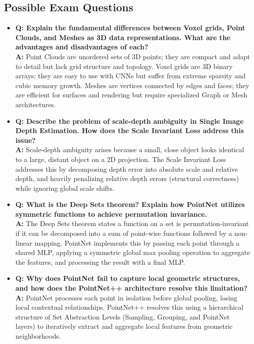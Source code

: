 \subsection{Possible Exam Questions}
\begin{itemize}
    \item \textbf{Q: Explain the fundamental differences between Voxel grids, Point Clouds, and Meshes as 3D data representations. What are the advantages and disadvantages of each?} \\
    \textbf{A:} Point Clouds are unordered sets of 3D points; they are compact and adapt to detail but lack grid structure and topology. Voxel grids are 3D binary arrays; they are easy to use with CNNs but suffer from extreme sparsity and cubic memory growth. Meshes are vertices connected by edges and faces; they are efficient for surfaces and rendering but require specialized Graph or Mesh architectures.
    \item \textbf{Q: Describe the problem of scale-depth ambiguity in Single Image Depth Estimation. How does the Scale Invariant Loss address this issue?} \\
    \textbf{A:} Scale-depth ambiguity arises because a small, close object looks identical to a large, distant object on a 2D projection. The Scale Invariant Loss addresses this by decomposing depth error into absolute scale and relative depth, and heavily penalizing relative depth errors (structural correctness) while ignoring global scale shifts.
    \item \textbf{Q: What is the Deep Sets theorem? Explain how PointNet utilizes symmetric functions to achieve permutation invariance.} \\
    \textbf{A:} The Deep Sets theorem states a function on a set is permutation-invariant if it can be decomposed into a sum of point-wise functions followed by a non-linear mapping. PointNet implements this by passing each point through a shared MLP, applying a symmetric global max pooling operation to aggregate the features, and processing the result with a final MLP.
    \item \textbf{Q: Why does PointNet fail to capture local geometric structures, and how does the PointNet++ architecture resolve this limitation?} \\
    \textbf{A:} PointNet processes each point in isolation before global pooling, losing local contextual relationships. PointNet++ resolves this using a hierarchical structure of Set Abstraction Levels (Sampling, Grouping, and PointNet layers) to iteratively extract and aggregate local features from geometric neighborhoods.

\end{itemize}
